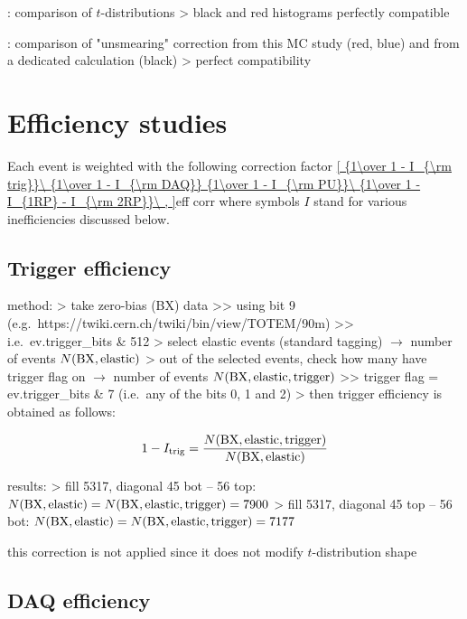 \>  : comparison of $t$-distributions
\>> black and red histograms perfectly compatible

\>  : comparison of "unsmearing" correction from this MC study (red, blue) and from a dedicated calculation (black)
\>> perfect compatibility



\section[efficiency]{Efficiency studies}

\vskip3mm
Each event is weighted with the following correction factor
\eqref{
	{1\over 1 - I_{\rm trig}}\ 
	{1\over 1 - I_{\rm DAQ}}
	{1\over 1 - I_{\rm PU}}\ 
	{1\over 1 - I_{1RP} - I_{\rm 2RP}}\ ,
}{eff corr}
where symbols $I$ stand for various inefficiencies discussed below.

\subsection[efficiency-trigger]{Trigger efficiency}

\> method:
\>> take zero-bias (BX) data
\>>> using bit 9 (e.g.~https://twiki.cern.ch/twiki/bin/view/TOTEM/90m)
\>>> i.e.~ev.trigger\_bits \& 512
\>> select elastic events (standard tagging) $\rightarrow$ number of events $N({\rm BX,elastic})$
\>> out of the selected events, check how many have trigger flag on $\rightarrow$ number of events $N({\rm BX,elastic,trigger})$
\>>> trigger flag = ev.trigger\_bits \& 7 (i.e.~any of the bits 0, 1 and 2)
\>> then trigger efficiency is obtained as follows:

$$1 - I_{\rm trig} = {N({\rm BX,elastic,trigger}) \over N({\rm BX,elastic})}$$

\> results:
\>> fill 5317, diagonal 45 bot -- 56 top: $N({\rm BX,elastic}) = N({\rm BX,elastic,trigger}) = 7900$
\>> fill 5317, diagonal 45 top -- 56 bot: $N({\rm BX,elastic}) = N({\rm BX,elastic,trigger}) = 7177$

\> this correction is not applied since it does not modify $t$-distribution shape


\subsection[efficiency-trigger]{DAQ efficiency}

